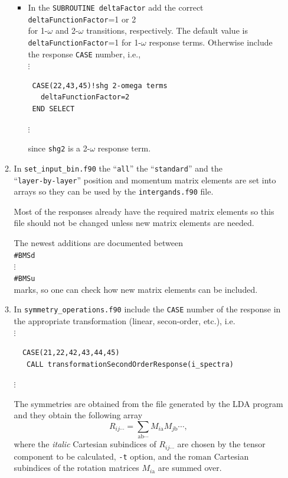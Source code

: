 \documentclass[12pt]{article}
\numberwithin{equation}{section}
\begin{document}
\begin{itemize}
\begin{enumerate}
\begin{itemize}
\item In the \verb=SUBROUTINE deltaFactor= add the 
correct\\ \verb=deltaFunctionFactor==1 or 2\\ for 1-$\omega$ and 
2-$\omega$ transitions, respectively.
 The default value is\\
\verb=deltaFunctionFactor==1 for 1-$\omega$ response terms.
Otherwise include the response \verb=CASE= number, i.e.,\\
$\vdots$
\begin{verbatim}
 CASE(22,43,45)!shg 2-omega terms
   deltaFunctionFactor=2
 END SELECT
\end{verbatim}
$\vdots$

since \verb=shg2= is a 2-$\omega$ response term.
\end{itemize} 

\item In \verb=set_input_bin.f90=
 the ``\verb=all='' the ``\verb=standard='' and the \\ 
``\verb=layer-by-layer=''
position and momentum matrix elements are set into arrays so they can be used by the 
\verb=intergands.f90= file. 

Most of the responses already have the required
matrix elements so this file should not be changed unless new matrix
elements are needed.

The newest additions are documented between\\
\verb=#BMSd=\\
$\vdots$\\
\verb=#BMSu=\\
marks, so one can check how new matrix elements can be included.

\item In \verb=symmetry_operations.f90= include the \verb=CASE= number
  of the response in the appropriate transformation (linear,
  secon-order, etc.), i.e.\\
$\vdots$
\begin{verbatim}
  CASE(21,22,42,43,44,45)
   CALL transformationSecondOrderResponse(i_spectra)
\end{verbatim} 
$\vdots$

The symmetries are obtained from the file generated by the LDA program
and they obtain the following array
\begin{equation}\label{uno}
R_{ij\cdots}=\sum_{\mathrm{ab}\cdots}M_{i\mathrm{a}} M_{j\mathrm{b}}\cdots
,
\end{equation}
where the {\it italic} Cartesian subindices of $R_{ij\cdots}$ are chosen by the
tensor component to be calculated, \verb=-t= option, 
and the $\mathrm{roman}$
Cartesian subindices of the rotation matrices $M_{i\mathrm{a}}$ are
summed over.


\end{enumerate}
\end{itemize}
\end{document}
